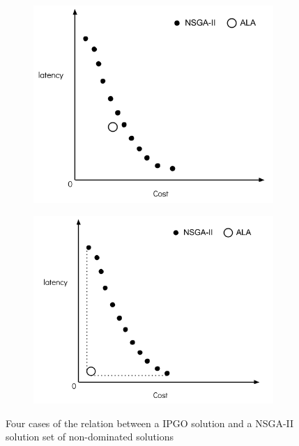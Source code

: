 \documentclass{llncs}
\begin{document}
\begin{figure}[H]
	\begin{subfigure}[b]{0.4\textwidth}
		\includegraphics[width=\textwidth]{pics/3.png}
		\caption{}
	\end{subfigure}
	\begin{subfigure}[b]{0.4\textwidth}
		\includegraphics[width=\textwidth]{pics/4.png}
		\caption{}
	\end{subfigure}
	\caption{Four cases of the relation between a IPGO solution and a NSGA-II solution set of non-dominated solutions}
\label{fig:Pareto}
\end{figure}
\end{document}

